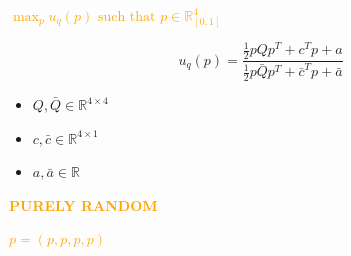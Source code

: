 \documentclass{beamer}
\begin{document}
\begin{frame}
    \centering
     \vspace{1cm}

    
\end{frame}

\begin{frame}
    \centering
    \Large\textcolor{orange}{
    \boldmath \( \max_p u_q(p)\text{ such that }p\in\mathbb{R}_{[0,1]}^{4}\)}
\end{frame}

\begin{frame}
    \begin{center}
    \begin{lemma}
     \boldmath\[ u_q(p) = \frac{\frac{1}{2} p Q  p^T + c^T  p + a} 
    {\frac{1}{2} p \bar{Q} p^T + \bar{c}^T p + \bar{a}}\]

    \begin{itemize}
      \item \boldmath\(Q, \bar{Q} \in\mathbb{R}^{4 \times 4}\)
      \item \boldmath\(c, \bar{c}\in\mathbb{R}^{4 \times 1}\) 
      \item \boldmath\(a, \bar{a}\in\mathbb{R}\)  
   \end{itemize}
    \end{lemma}
    \end{center}
\end{frame}

\begin{frame}
    \begin{center}
    
    \end{center}
\end{frame}

\begin{frame}
    \begin{center}
    
    \end{center}
\end{frame}

\begin{frame}
    \begin{center}
    
    \end{center}
\end{frame}

\begin{frame}
    \begin{center}
    \Large{
    \textbf{\textcolor{orange}{PURELY RANDOM}} \vspace{1cm}

    \textcolor{orange}{\boldmath\( p = (p, p, p, p)\)}}
    \end{center}
\end{frame}
\end{document}
